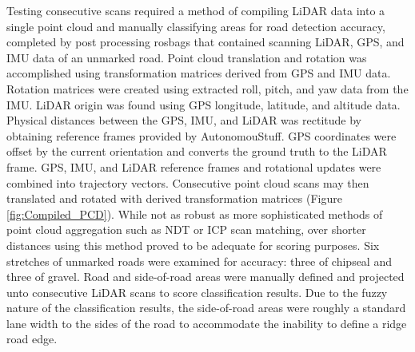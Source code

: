\documentclass[journal,onecolumn]{IEEEtran}
\begin{document}
	{Testing consecutive scans required a method of compiling LiDAR data into a single point cloud and manually classifying areas for road detection accuracy, completed by post processing rosbags that contained scanning LiDAR, GPS, and IMU data of an unmarked road. Point cloud translation and rotation was accomplished using transformation matrices derived from GPS and IMU data. Rotation matrices were created using extracted roll, pitch, and yaw data from the IMU. LiDAR origin was found using GPS longitude, latitude, and altitude data. Physical distances between the GPS, IMU, and LiDAR was rectitude by obtaining reference frames provided by AutonomouStuff. GPS coordinates were offset by the current orientation and converts the ground truth to the LiDAR frame. GPS, IMU, and LiDAR reference frames and rotational updates were combined into trajectory vectors. Consecutive point cloud scans may then translated and rotated with derived transformation matrices (Figure \ref{fig:Compiled_PCD}). While not as robust as more sophisticated methods of point cloud aggregation such as NDT or ICP scan matching, over shorter distances using this method proved to be adequate for scoring purposes. Six stretches of unmarked roads were examined for accuracy: three of chipseal and three of gravel. Road and side-of-road areas were manually defined and projected unto consecutive LiDAR scans to score classification results. Due to the fuzzy nature of the classification results, the side-of-road areas were roughly a standard lane width to the sides of the road to accommodate the inability to define a ridge road edge.}
	
\end{document}
